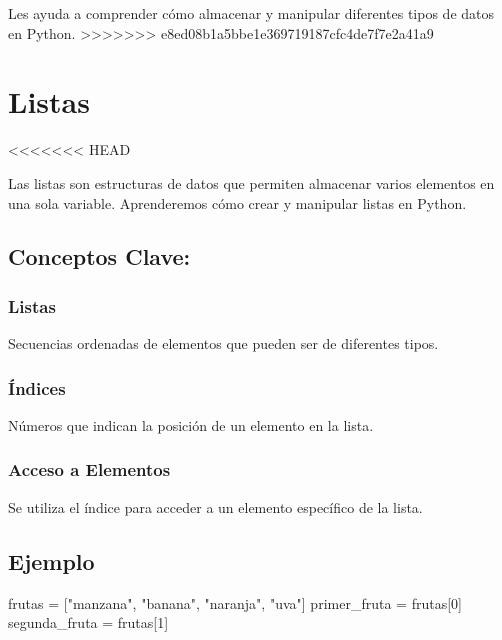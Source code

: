 \documentclass[
  a4paper,
  DIV=11,
  numbers=noendperiod,
  onepage,
  openany]{scrreprt}
\newenvironment{Shaded}{\begin{snugshade}}{\end{snugshade}}
\newcommand{\DecValTok}[1]{\textcolor[rgb]{0.68,0.00,0.00}{#1}}
\newcommand{\NormalTok}[1]{\textcolor[rgb]{0.00,0.23,0.31}{#1}}
\newcommand{\OperatorTok}[1]{\textcolor[rgb]{0.37,0.37,0.37}{#1}}
\newcommand{\StringTok}[1]{\textcolor[rgb]{0.13,0.47,0.30}{#1}}
\begin{document}
Les ayuda a comprender cómo almacenar y manipular diferentes tipos de
datos en Python.
\textgreater\textgreater\textgreater\textgreater\textgreater\textgreater\textgreater{}
e8ed08b1a5bbe1e369719187cfc4de7f7e2a41a9

\hypertarget{listas}{%
\chapter{Listas}\label{listas}}

\textless\textless\textless\textless\textless\textless\textless{} HEAD

Las listas son estructuras de datos que permiten almacenar varios
elementos en una sola variable. Aprenderemos cómo crear y manipular
listas en Python.

\hypertarget{conceptos-clave-18}{%
\section{Conceptos Clave:}\label{conceptos-clave-18}}

\hypertarget{listas-1}{%
\subsection{Listas}\label{listas-1}}

Secuencias ordenadas de elementos que pueden ser de diferentes tipos.

\hypertarget{uxedndices}{%
\subsection{Índices}\label{uxedndices}}

Números que indican la posición de un elemento en la lista.

\hypertarget{acceso-a-elementos}{%
\subsection{Acceso a Elementos}\label{acceso-a-elementos}}

Se utiliza el índice para acceder a un elemento específico de la lista.

\hypertarget{ejemplo-18}{%
\section{Ejemplo}\label{ejemplo-18}}

\begin{Shaded}
\begin{Highlighting}[]
\NormalTok{frutas }\OperatorTok{=}\NormalTok{ [}\StringTok{"manzana"}\NormalTok{, }\StringTok{"banana"}\NormalTok{, }\StringTok{"naranja"}\NormalTok{, }\StringTok{"uva"}\NormalTok{]}
\NormalTok{primer\_fruta }\OperatorTok{=}\NormalTok{ frutas[}\DecValTok{0}\NormalTok{]}
\NormalTok{segunda\_fruta }\OperatorTok{=}\NormalTok{ frutas[}\DecValTok{1}\NormalTok{]}
\end{Highlighting}
\end{Shaded}
\end{document}

